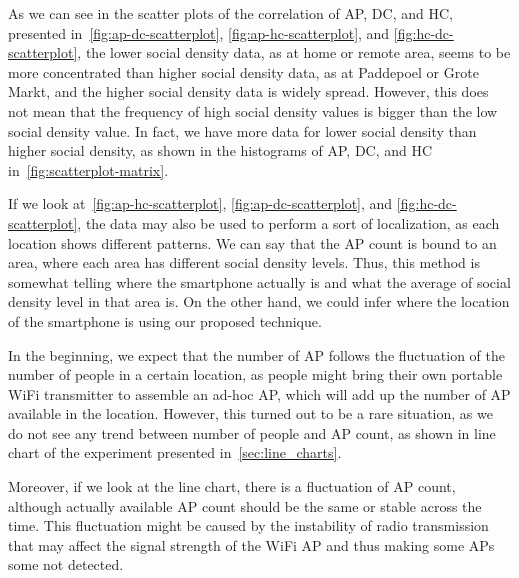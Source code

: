 As we can see in the scatter plots of the correlation of \ac{AP}, \ac{DC}, and \ac{HC}, presented in~\autoref{fig:ap-dc-scatterplot}, \autoref{fig:ap-hc-scatterplot}, and \autoref{fig:hc-dc-scatterplot}, the lower social density data, as at home or remote area, seems to be more concentrated than higher social density data, as at Paddepoel or Grote Markt, and the higher social density data is widely spread. However, this does not mean that the frequency of high social density values is bigger than the low social density value. In fact, we have more data for lower social density than higher social density, as shown in the histograms of \ac{AP}, \ac{DC}, and \ac{HC} in~\autoref{fig:scatterplot-matrix}.

If we look at~\autoref{fig:ap-hc-scatterplot}, \autoref{fig:ap-dc-scatterplot}, and \autoref{fig:hc-dc-scatterplot}, the data may also be used to perform a sort of localization, as each location shows different patterns. We can say that the \ac{AP} count is bound to an area, where each area has different social density levels. Thus, this method is somewhat telling where the smartphone actually is and what the average of social density level in that area is. On the other hand, we could infer where the location of the smartphone is using our proposed technique.

In the beginning, we expect that the number of \ac{AP} follows the fluctuation of the number of people in a certain location, as people might bring their own portable WiFi transmitter to assemble an ad-hoc \ac{AP}, which will add up the number of \ac{AP} available in the location. However, this turned out to be a rare situation, as we do not see any trend between number of people and \ac{AP} count, as shown in line chart of the experiment presented in~\autoref{sec:line_charts}.

Moreover, if we look at the line chart, there is a fluctuation of \ac{AP} count, although actually available \ac{AP} count should be the same or stable across the time. This fluctuation might be caused by the instability of radio transmission that may affect the signal strength of the WiFi \ac{AP} and thus making some \ac{AP}s some not detected.


